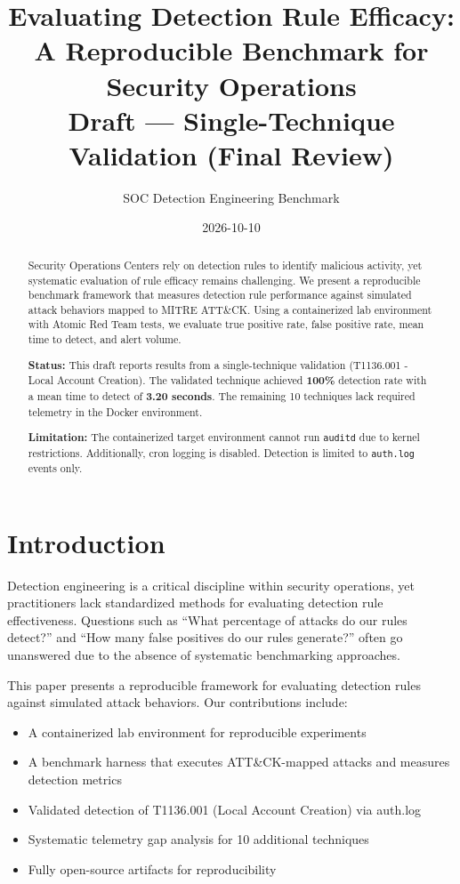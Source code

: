 \documentclass[11pt,a4paper]{article}
\title{Evaluating Detection Rule Efficacy: A Reproducible Benchmark for Security Operations\\
\large{Draft --- Single-Technique Validation (Final Review)}}
\author{SOC Detection Engineering Benchmark}
\date{2026-10-10}
\begin{document}
\maketitle

\begin{abstract}
Security Operations Centers rely on detection rules to identify malicious activity, yet systematic evaluation of rule efficacy remains challenging. We present a reproducible benchmark framework that measures detection rule performance against simulated attack behaviors mapped to MITRE ATT\&CK. Using a containerized lab environment with Atomic Red Team tests, we evaluate true positive rate, false positive rate, mean time to detect, and alert volume.

\textbf{Status:} This draft reports results from a single-technique validation (T1136.001 - Local Account Creation). The validated technique achieved \textbf{100\%} detection rate with a mean time to detect of \textbf{3.20 seconds}. The remaining 10 techniques lack required telemetry in the Docker environment.

\textbf{Limitation:} The containerized target environment cannot run \texttt{auditd} due to kernel restrictions. Additionally, cron logging is disabled. Detection is limited to \texttt{auth.log} events only.
\end{abstract}

\section{Introduction}

Detection engineering is a critical discipline within security operations, yet practitioners lack standardized methods for evaluating detection rule effectiveness. Questions such as ``What percentage of attacks do our rules detect?'' and ``How many false positives do our rules generate?'' often go unanswered due to the absence of systematic benchmarking approaches.

This paper presents a reproducible framework for evaluating detection rules against simulated attack behaviors. Our contributions include:

\begin{itemize}
    \item A containerized lab environment for reproducible experiments
    \item A benchmark harness that executes ATT\&CK-mapped attacks and measures detection metrics
    \item Validated detection of T1136.001 (Local Account Creation) via auth.log
    \item Systematic telemetry gap analysis for 10 additional techniques
    \item Fully open-source artifacts for reproducibility
\end{itemize}
\end{document}
